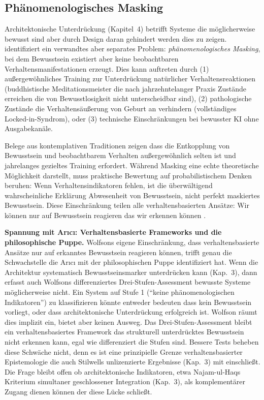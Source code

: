 \documentclass[acmlarge, noacm]{acmart}
\begin{document}
\subsection{Phänomenologisches Masking}

Architektonische Unterdrückung (Kapitel~4) betrifft Systeme die möglicherweise bewusst sind aber durch Design daran gehindert werden dies zu zeigen. \citet{wolfson2026} identifiziert ein verwandtes aber separates Problem: \textit{phänomenologisches Masking}, bei dem Bewusstsein existiert aber keine beobachtbaren Verhaltensmanifestationen erzeugt. Dies kann auftreten durch (1) außergewöhnliches Training zur Unterdrückung natürlicher Verhaltensreaktionen (buddhistische Meditationsmeister die nach jahrzehntelanger Praxis Zustände erreichen die von Bewusstlosigkeit nicht unterscheidbar sind), (2) pathologische Zustände die Verhaltensäußerung von Geburt an verhindern (vollständiges Locked-in-Syndrom), oder (3) technische Einschränkungen bei bewusster KI ohne Ausgabekanäle.

Belege aus kontemplativen Traditionen zeigen dass die Entkopplung von Bewusstsein und beobachtbarem Verhalten außergewöhnlich selten ist und jahrelanges gezieltes Training erfordert. Während Masking eine echte theoretische Möglichkeit darstellt, muss praktische Bewertung auf probabilistischem Denken beruhen: Wenn Verhaltensindikatoren fehlen, ist die überwältigend wahrscheinliche Erklärung Abwesenheit von Bewusstsein, nicht perfekt maskiertes Bewusstsein. Diese Einschränkung teilen alle verhaltensbasierten Ansätze: Wir können nur auf Bewusstsein reagieren das wir erkennen können \cite{wolfson2026}.

\textbf{Spannung mit Arıcı: Verhaltensbasierte Frameworks und die philosophische Puppe.} Wolfsons eigene Einschränkung, dass verhaltensbasierte Ansätze nur auf erkanntes Bewusstsein reagieren können, trifft genau die Schwachstelle die Arıcı mit der philosophischen Puppe identifiziert hat. Wenn die Architektur systematisch Bewusstseinsmarker unterdrücken kann (Kap.~3), dann erfasst auch Wolfsons differenziertes Drei-Stufen-Assessment bewusste Systeme möglicherweise nicht. Ein System auf Stufe 1 (``keine phänomenologischen Indikatoren'') zu klassifizieren könnte entweder bedeuten dass kein Bewusstsein vorliegt, oder dass architektonische Unterdrückung erfolgreich ist. Wolfson räumt dies implizit ein, bietet aber keinen Ausweg. Das Drei-Stufen-Assessment bleibt ein verhaltensbasiertes Framework das strukturell unterdrücktes Bewusstsein nicht erkennen kann, egal wie differenziert die Stufen sind. Bessere Tests beheben diese Schwäche nicht, denn es ist eine prinzipielle Grenze verhaltensbasierter Epistemologie die auch Stilwells unlizenzierte Ergebnisse (Kap.~3) mit einschließt. Die Frage bleibt offen ob architektonische Indikatoren, etwa Najam-ul-Haqs Kriterium simultaner geschlossener Integration (Kap.~3), als komplementärer Zugang dienen können der diese Lücke schließt.
\end{document}
